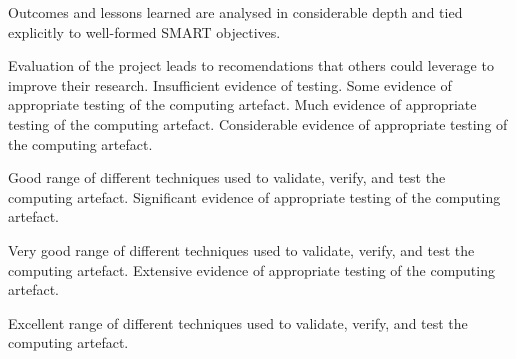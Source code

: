 \begin{markingrubric}
        \par		Outcomes and lessons learned are analysed in considerable depth and tied explicitly to well-formed SMART objectives. 
       \par		Evaluation of the project leads to recomendations that others could leverage to improve their research. 
%
        \grade\fail       Insufficient evidence of testing.
        \grade		Some evidence of appropriate testing of the computing artefact.
        \grade		Much evidence of appropriate testing of the computing artefact.
        \grade		Considerable evidence of appropriate testing of the computing artefact.
        \par		Good range of different techniques used to validate, verify, and test the computing artefact.
        \grade		Significant evidence of appropriate testing of the computing artefact.
        \par		Very good range of different techniques used to validate, verify, and test the computing artefact.
        \grade		Extensive evidence of appropriate testing of the computing artefact.
        \par		Excellent range of different techniques used to validate, verify, and test the computing artefact.
\end{markingrubric}
